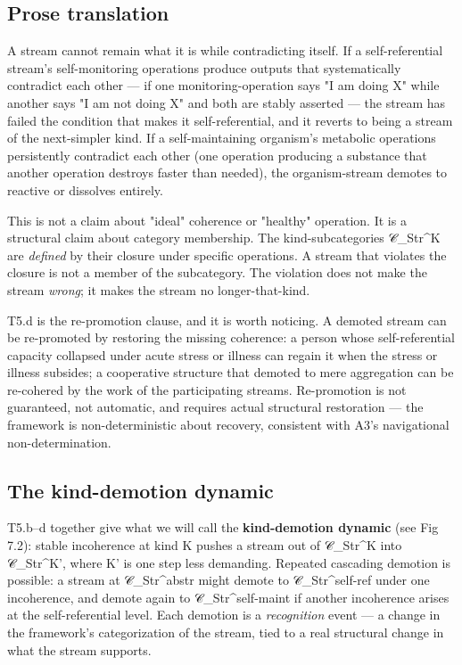 \documentclass[11pt, openany]{book}
\begin{document}
\subsection{Prose translation}

A stream cannot remain what it is while contradicting itself. If a self-referential stream's self-monitoring operations produce outputs that systematically contradict each other --- if one monitoring-operation says "I am doing X" while another says "I am not doing X" and both are stably asserted --- the stream has failed the condition that makes it self-referential, and it reverts to being a stream of the next-simpler kind. If a self-maintaining organism's metabolic operations persistently contradict each other (one operation producing a substance that another operation destroys faster than needed), the organism-stream demotes to reactive or dissolves entirely.

This is not a claim about "ideal" coherence or "healthy" operation. It is a structural claim about category membership. The kind-subcategories 𝒞\_\allowbreak{}Str\textasciicircum{}K are \textit{defined} by their closure under specific operations. A stream that violates the closure is not a member of the subcategory. The violation does not make the stream \textit{wrong}; it makes the stream no longer-that-kind.

T5.d is the re-promotion clause, and it is worth noticing. A demoted stream can be re-promoted by restoring the missing coherence: a person whose self-referential capacity collapsed under acute stress or illness can regain it when the stress or illness subsides; a cooperative structure that demoted to mere aggregation can be re-cohered by the work of the participating streams. Re-promotion is not guaranteed, not automatic, and requires actual structural restoration --- the framework is non-deterministic about recovery, consistent with A3's navigational non-determination.

\subsection{The kind-demotion dynamic}

T5.b–d together give what we will call the \textbf{kind-demotion dynamic} (see Fig 7.2): stable incoherence at kind K pushes a stream out of 𝒞\_\allowbreak{}Str\textasciicircum{}K into 𝒞\_\allowbreak{}Str\textasciicircum{}K', where K' is one step less demanding. Repeated cascading demotion is possible: a stream at 𝒞\_\allowbreak{}Str\textasciicircum{}abstr might demote to 𝒞\_\allowbreak{}Str\textasciicircum{}self-ref under one incoherence, and demote again to 𝒞\_\allowbreak{}Str\textasciicircum{}self-maint if another incoherence arises at the self-referential level. Each demotion is a \textit{recognition} event --- a change in the framework's categorization of the stream, tied to a real structural change in what the stream supports.
\end{document}
